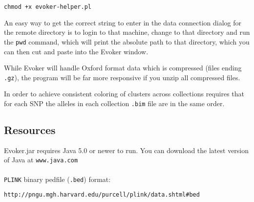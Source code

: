\documentclass{article}
\begin{document}
\begin{verbatim}
chmod +x evoker-helper.pl
\end{verbatim}

\noindent An easy way to get the correct string to enter in the data connection dialog for the remote directory is to login to that machine, change to that directory and run the \texttt{pwd} command, which will print the absolute path to that directory, which you can then cut and paste into the Evoker window.

\noindent While Evoker will handle Oxford format data which is compressed (files ending \texttt{.gz}), the program will be far more responsive if you unzip all compressed files.

\noindent In order to achieve consistent coloring of clusters across collections requires that for each SNP the alleles in each collection \texttt{.bim} file are in the same order.

\subsection{Resources}
Evoker.jar requires Java 5.0 or newer to run. You can download the latest version of Java at \texttt{www.java.com}
\\
\\
\texttt{PLINK} binary pedfile (\texttt{.bed}) format:  

\indent \texttt{http://pngu.mgh.harvard.edu/purcell/plink/data.shtml\#bed}
\end{document}
